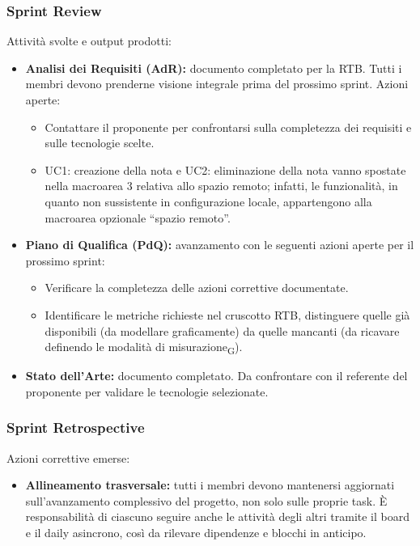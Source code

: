 \subsubsection{Sprint Review}
Attività svolte e output prodotti:
\begin{itemize}
    \item \textbf{Analisi dei Requisiti (AdR):} documento completato per la
          RTB. Tutti i membri devono prenderne visione
          integrale prima del prossimo sprint. Azioni aperte:
          \begin{itemize}
              \item Contattare il proponente per confrontarsi sulla completezza
                    dei requisiti e sulle tecnologie scelte.
              \item UC1: creazione della nota e UC2: eliminazione della nota vanno spostate nella macroarea 3 relativa allo spazio remoto; infatti, le funzionalità, in quanto non sussistente in configurazione locale,
                   appartengono alla macroarea opzionale ``spazio remoto''.
          \end{itemize}
    \item \textbf{Piano di Qualifica (PdQ):} avanzamento con le seguenti
          azioni aperte per il prossimo sprint:
          \begin{itemize}
              \item Verificare la completezza delle azioni correttive documentate.
              \item Identificare le metriche richieste nel cruscotto RTB, distinguere
                    quelle già disponibili (da modellare graficamente) da quelle
                    mancanti (da ricavare definendo le modalità di misurazione\textsubscript{G}).
          \end{itemize}
    \item \textbf{Stato dell'Arte:} documento completato. Da confrontare con
          il referente del proponente per validare le tecnologie selezionate.
\end{itemize}

\subsubsection{Sprint Retrospective}
Azioni correttive emerse:
\begin{itemize}
    \item \textbf{Allineamento trasversale:} tutti i membri devono mantenersi
          aggiornati sull'avanzamento complessivo del progetto, non solo sulle
          proprie task. È responsabilità di ciascuno seguire anche le attività
          degli altri tramite il board e il daily asincrono, così da rilevare
          dipendenze e blocchi in anticipo.
\end{itemize}

